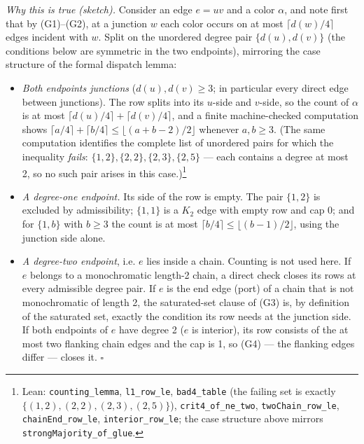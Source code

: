 \documentclass[11pt]{article}
\theoremstyle{definition}
\theoremstyle{remark}
\providecommand{\tightlist}{\setlength{\itemsep}{0pt}\setlength{\parskip}{0pt}}
\begin{document}
\emph{Why this is true (sketch).} Consider an edge \(e = uv\) and a color \(\alpha\), and note first that by (G1)--(G2), at a junction \(w\) each color occurs on at most \(\lceil d(w)/4 \rceil\) edges incident with \(w\). Split on the unordered degree pair \(\{d(u), d(v)\}\) (the conditions below are symmetric in the two endpoints), mirroring the case structure of the formal dispatch lemma:

\begin{itemize}
\tightlist
\item
  \emph{Both endpoints junctions} (\(d(u), d(v) \ge 3\); in particular every direct edge between junctions). The row splits into its \(u\)-side and \(v\)-side, so the count of \(\alpha\) is at most \(\lceil d(u)/4 \rceil + \lceil d(v)/4 \rceil\), and a finite machine-checked computation shows \(\lceil a/4 \rceil + \lceil b/4 \rceil \le \lfloor (a+b-2)/2 \rfloor\) whenever \(a, b \ge 3\). (The same computation identifies the complete list of unordered pairs for which the inequality \emph{fails}: \(\{1,2\}, \{2,2\}, \{2,3\}, \{2,5\}\) --- each contains a degree at most 2, so no such pair arises in this case.)\footnote{Lean: \texttt{counting\_lemma}, \texttt{l1\_row\_le}, \texttt{bad4\_table} (the failing set is exactly \(\{(1,2),(2,2),(2,3),(2,5)\}\)), \texttt{crit4\_of\_ne\_two}, \texttt{twoChain\_row\_le}, \texttt{chainEnd\_row\_le}, \texttt{interior\_row\_le}; the case structure above mirrors \texttt{strongMajority\_of\_glue}.}
\item
  \emph{A degree-one endpoint.} Its side of the row is empty. The pair \(\{1,2\}\) is excluded by admissibility; \(\{1,1\}\) is a \(K_2\) edge with empty row and cap 0; and for \(\{1,b\}\) with \(b \ge 3\) the count is at most \(\lceil b/4 \rceil \le \lfloor (b-1)/2 \rfloor\), using the junction side alone.
\item
  \emph{A degree-two endpoint}, i.e. \(e\) lies inside a chain. Counting is not used here. If \(e\) belongs to a monochromatic length-2 chain, a direct check closes its rows at every admissible degree pair. If \(e\) is the end edge (port) of a chain that is not monochromatic of length 2, the saturated-set clause of (G3) is, by definition of the saturated set, exactly the condition its row needs at the junction side. If both endpoints of \(e\) have degree 2 (\(e\) is interior), its row consists of the at most two flanking chain edges and the cap is 1, so (G4) --- the flanking edges differ --- closes it. \(\square\)
\end{itemize}
\end{document}
